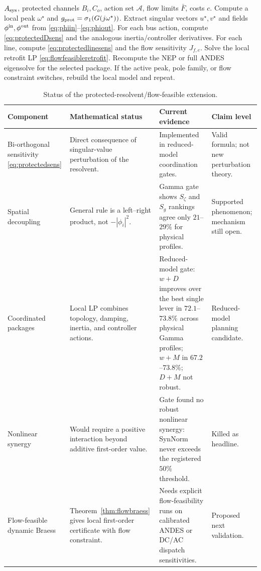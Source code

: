 \documentclass[journal]{IEEEtran}
\begin{document}
\begin{algorithm}[t]
\caption{Flow-Feasible Protected-Resolvent Retrofitting}
\label{alg:protectedretrofit}
\begin{algorithmic}[1]
\REQUIRE $A_{\rm sys}$, protected channels $B_i,C_o$, action set $\mathcal{A}$, flow limits $\bar F$, costs $c$.
\STATE Compute a local peak $\omega^\star$ and $g_{\rm prot}=\sigma_1(G(j\omega^\star))$.
\STATE Extract singular vectors $u^\star,v^\star$ and fields $\phi^{\rm in},\phi^{\rm out}$ from \eqref{eq:phiin}--\eqref{eq:phiout}.
\STATE For each bus action, compute \eqref{eq:protectedDsens} and the analogous inertia/controller derivatives.
\STATE For each line, compute \eqref{eq:protectedlinesens} and the flow sensitivity $J_{f,e}$.
\STATE Solve the local retrofit LP \eqref{eq:flowfeasibleretrofit}.
\STATE Recompute the NEP or full ANDES eigensolve for the selected package.
\STATE If the active peak, pole family, or flow constraint switches, rebuild the local model and repeat.
\end{algorithmic}
\end{algorithm}

\begin{table}[t]
\centering
\caption{Status of the protected-resolvent/flow-feasible extension.}
\label{tab:protectedstatus}
\scriptsize
\begin{tabular}{@{}p{}p{}p{}p{}@{}}
\toprule
Component & Mathematical status & Current evidence & Claim level\\
\midrule
Bi-orthogonal sensitivity \eqref{eq:protectedsens}
& Direct consequence of singular-value perturbation of the resolvent.
& Implemented in reduced-model coordination gates.
& Valid formula; not new perturbation theory.\\
Spatial decoupling
& General rule is a left--right product, not $-|\phi_i|^2$.
& Gamma gate shows $S_\zeta$ and $S_g$ rankings agree only $21$--$29\%$ for physical profiles.
& Supported phenomenon; mechanism still open.\\
Coordinated packages
& Local LP combines topology, damping, inertia, and controller actions.
& Reduced-model gate: $w+D$ improves over the best single lever in $72.1$--$73.8\%$ across physical Gamma profiles; $w+M$ in $67.2$--$73.8\%$; $D+M$ not robust.
& Reduced-model planning candidate.\\
Nonlinear synergy
& Would require a positive interaction beyond additive first-order value.
& Gate found no robust nonlinear synergy: SynNorm never exceeds the registered $50\%$ threshold.
& Killed as headline.\\
Flow-feasible dynamic Braess
& Theorem~\ref{thm:flowbraess} gives local first-order certificate with flow constraint.
& Needs explicit flow-feasibility runs on calibrated ANDES or DC/AC dispatch sensitivities.
& Proposed next validation.\\
\bottomrule
\end{tabular}
\end{table}
\end{document}
